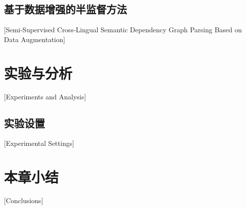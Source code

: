 \subsection{基于数据增强的半监督方法}[Semi-Supervised Cross-Lingual Semantic Dependency Graph Parsing Based on Data Augmentation]

\section{实验与分析}[Experiments and Analysis]

\subsection{实验设置}[Experimental Settings]


\section{本章小结}[Conclusions]


